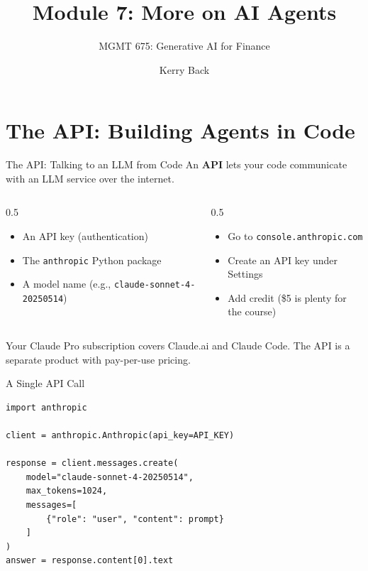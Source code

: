 \documentclass[aspectratio=169]{beamer}
\subtitle{MGMT 675: Generative AI for Finance}
\title{Module 7: More on AI Agents}
\author{Kerry Back}
\date{}
\begin{document}
\maketitle

\section{The API: Building Agents in Code}

\begin{frame}{The API: Talking to an LLM from Code}
An \textbf{API} lets your code communicate with an LLM service over the internet.
\vspace{0.3cm}
\begin{columns}[T]
\begin{column}{0.5\textwidth}
\begin{shadedbox}[title=\textbf{What You Need}]
\begin{itemize}\small
  \item An API key (authentication)
  \item The \texttt{anthropic} Python package
  \item A model name (e.g., \texttt{claude-sonnet-4-20250514})
\end{itemize}
\end{shadedbox}
\end{column}
\begin{column}{0.5\textwidth}
\begin{shadedbox}[title=\textbf{Getting Your Key}]
\begin{itemize}\small
  \item Go to \texttt{console.anthropic.com}
  \item Create an API key under Settings
  \item Add credit (\$5 is plenty for the course)
\end{itemize}
\end{shadedbox}
\end{column}
\end{columns}
\vspace{0.3cm}
Your Claude Pro subscription covers Claude.ai and Claude Code.  The API is a separate product with pay-per-use pricing.
\end{frame}

\begin{frame}[fragile]{A Single API Call}
\begin{shadedbox}[title=\textbf{Calling the Anthropic API}]
\begin{verbatim}
import anthropic

client = anthropic.Anthropic(api_key=API_KEY)

response = client.messages.create(
    model="claude-sonnet-4-20250514",
    max_tokens=1024,
    messages=[
        {"role": "user", "content": prompt}
    ]
)
answer = response.content[0].text
\end{verbatim}
\end{shadedbox}
\end{frame}
\end{document}
